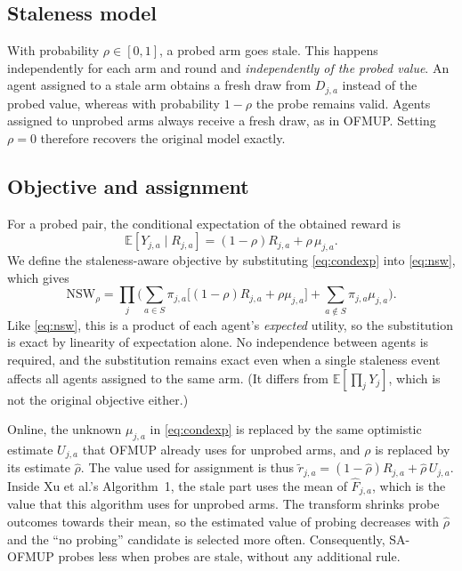 \documentclass[letterpaper]{article}
\newcommand{\NSW}{\mathrm{NSW}}
\newcommand{\E}{\mathbb{E}}
\newcommand{\rhat}{\hat{\rho}}
\begin{document}
\subsection{Staleness model}
With probability $\rho\in[0,1]$, a probed arm goes stale. This happens
independently for each arm and round and \emph{independently of the probed
value}. An agent assigned to a stale arm obtains a fresh draw from $D_{j,a}$
instead of the probed value, whereas with probability $1-\rho$ the probe remains
valid. Agents assigned to unprobed arms always receive a fresh draw, as in
OFMUP. Setting $\rho=0$ therefore recovers the original model exactly.

\subsection{Objective and assignment}
For a probed pair, the conditional expectation of the obtained reward is
\begin{equation}
  \E[Y_{j,a}\mid R_{j,a}]=(1-\rho)R_{j,a}+\rho\,\mu_{j,a}.
  \label{eq:condexp}
\end{equation}
We define the staleness-aware objective by substituting \eqref{eq:condexp} into
\eqref{eq:nsw}, which gives
\begin{equation}
  \NSW_{\rho}=\prod_{j}\Big(\sum_{a\in S}\pi_{j,a}\big[(1-\rho)R_{j,a}+\rho\mu_{j,a}\big]+\sum_{a\notin S}\pi_{j,a}\mu_{j,a}\Big).
\end{equation}
Like \eqref{eq:nsw}, this is a product of each agent's \emph{expected} utility,
so the substitution is exact by linearity of expectation alone. No independence
between agents is required, and the substitution remains exact even when a
single staleness event affects all agents assigned to the same arm. (It differs
from $\E[\prod_j Y_j]$, which is not the original objective either.)

Online, the unknown $\mu_{j,a}$ in \eqref{eq:condexp} is replaced by the same
optimistic estimate $U_{j,a}$ that OFMUP already uses for unprobed arms, and
$\rho$ is replaced by its estimate $\rhat$. The value used for assignment is thus
$\tilde r_{j,a}=(1-\rhat)R_{j,a}+\rhat\,U_{j,a}$. Inside Xu et al.'s Algorithm~1, the
stale part uses the mean of $\hat F_{j,a}$, which is the value that this
algorithm uses for unprobed arms. The transform shrinks probe outcomes towards
their mean, so the estimated value of probing decreases with $\rhat$ and the
``no probing'' candidate is selected more often. Consequently, SA-OFMUP probes
less when probes are stale, without any additional rule.
\end{document}
